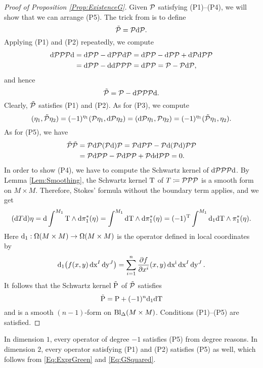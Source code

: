\documentclass[\MainFolder/Text.tex]{subfiles}
\begin{document}
\begin{proof}[Proof of Proposition \ref{Prop:ExistenceG}]
Given $\mathcal{P}$ satisfying (P1)--(P4), we will show that we can arrange (P5). The trick from \cite{Mnev2009} is to define
$$ \tilde{\mathcal{P}} = \mathcal{P} \mathrm{d} \mathcal{P}. $$
Applying (P1) and (P2) repeatedly, we compute
\begin{equation}\label{Eq:ExprGreen}
\begin{aligned}
\mathrm{d} \mathcal{P} \mathcal{P} \mathcal{P} \mathrm{d} &= \mathrm{d} \mathcal{P} \mathcal{P} - \mathrm{d} \mathcal{P} \mathcal{P} \mathrm{d} \mathcal{P} = \mathrm{d} \mathcal{P} \mathcal{P} - \mathrm{d} \mathcal{P} \mathcal{P} + \mathrm{d} \mathcal{P} \mathrm{d} \mathcal{P} \mathcal{P} \\ &= \mathrm{d} \mathcal{P} \mathcal{P} - \mathrm{d} \mathrm{d} \mathcal{P} \mathcal{P} \mathcal{P} = \mathrm{d} \mathcal{P} \mathcal{P} = \mathcal{P} - \mathcal{P} \mathrm{d} \mathcal{P}, 
\end{aligned}
\end{equation}
and hence
$$ \tilde{\mathcal{P}} = \mathcal{P} - \mathrm{d} \mathcal{P} \mathcal{P} \mathcal{P} \mathrm{d}. $$
Clearly, $\tilde{\mathcal{P}}$ satisfies (P1) and (P2). As for (P3), we compute
$$ (\eta_1, \tilde{\mathcal{P}} \eta_2) = (-1)^{\eta_1}(\mathcal{P} \eta_1, \mathrm{d} \mathcal{P} \eta_2) = (\mathrm{d} \mathcal{P} \eta_1, \mathcal{P} \eta_2) = (-1)^{\eta_1}(\tilde{\mathcal{P}}\eta_1,\eta_2). $$
As for (P5), we have
\begin{equation}\label{Eq:GSquared}
\begin{aligned}
\tilde{\mathcal{P}} \tilde{\mathcal{P}} &= \mathcal{P} \mathrm{d} \mathcal{P} (\mathcal{P}\mathrm{d}) \mathcal{P} = \mathcal{P} \mathrm{d} \mathcal{P} \mathcal{P} - \mathcal{P} \mathrm{d} (\mathcal{P} \mathrm{d}) \mathcal{P} \mathcal{P} \\
&= \mathcal{P} \mathrm{d} \mathcal{P} \mathcal{P} - \mathcal{P} \mathrm{d} \mathcal{P} \mathcal{P} + \mathcal{P} \mathrm{d} \mathrm{d} \mathcal{P} \mathcal{P} = 0.
\end{aligned}
\end{equation}
In order to show (P4), we have to compute the Schwartz kernel of $\mathrm{d}\mathcal{P}\mathcal{P}\mathcal{P}\mathrm{d}$. By Lemma \ref{Lem:Smoothing}, the Schwartz kernel $\mathrm{T}$ of $T\coloneqq \mathcal{P} \mathcal{P} \mathcal{P}$ is a smooth form on $M \times M$. Therefore, Stokes' formula without the boundary term applies, and we get 
$$ (\mathrm{d} T \mathrm{d})\eta = \mathrm{d} \int^{M_1} \mathrm{T} \wedge \mathrm{d} \pi_1^*(\eta) = \int^{M_1} \mathrm{d} \mathrm{T} \wedge \mathrm{d} \pi_1^*(\eta) = (-1)^{\mathrm{T}} \int^{M_1} \mathrm{d}_1 \mathrm{d} \mathrm{T} \wedge \pi_1^*(\eta). $$
Here $\mathrm{d}_1: \Omega(M\times M) \rightarrow \Omega(M\times M)$ is the operator defined in local coordinates by
$$ \mathrm{d}_1\bigl(f(x,y)\operatorname{dx}^I\operatorname{dy}^J\bigr) = \sum_{i=1}^n \frac{\partial f}{\partial x^i}(x,y)\operatorname{dx^i}\operatorname{dx}^I \operatorname{dy}^J. $$
It follows that the Schwartz kernel $\tilde{\mathrm{P}}$ of $\tilde{\mathcal{P}}$ satisfies 
$$ \tilde{\mathrm{P}} = \mathrm{P} + (-1)^{n} \mathrm{d}_1 \mathrm{d} \mathrm{T} $$
and is a smooth $(n-1)$-form on $\mathrm{Bl}_\Delta(M\times M)$. Conditions (P1)--(P5) are satisfied. \qedhere
\end{proof}

\begin{Remark}
In dimension $1$, every operator of degree $-1$ satisfies (P5) from degree reasons. In dimension $2$, every operator satisfying (P1) and (P2) satisfies (P5) as well, which follows from \eqref{Eq:ExprGreen} and \eqref{Eq:GSquared}.
\end{Remark}
\end{document}
